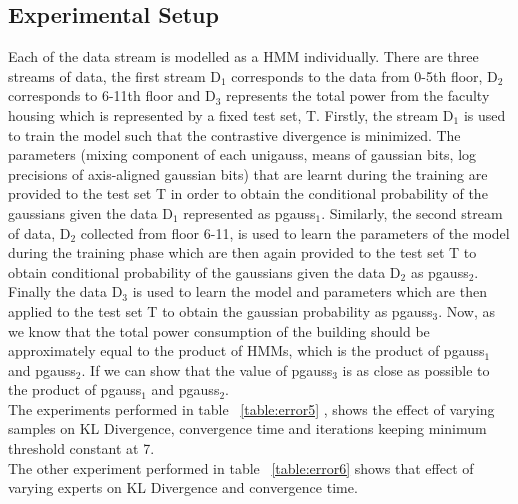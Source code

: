 \documentclass{sig-alternate}
\begin{document}
\subsection{ Experimental Setup } 
Each of the data stream is modelled as a HMM individually. There are three streams of data, the first stream D$_{1}$ corresponds to the data from 0-5th floor, D$_{2}$ corresponds to 6-11th floor and D$_{3}$ represents the total power from the faculty housing which is represented by a fixed test set, T. Firstly, the stream D$_{1}$ is used to train the model such that the contrastive divergence is minimized. The parameters (mixing component of each unigauss, means of gaussian bits, log precisions of axis-aligned gaussian bits) that are learnt during the training are provided to the test set T in order to obtain the conditional probability of the gaussians given the data D$_{1}$ represented as pgauss$_{1}$. Similarly, the second stream of data, D$_{2}$ collected from floor 6-11, is used to learn the parameters of the model during the training phase which are then again provided to the test set T to obtain conditional probability of the gaussians given the data D$_{2}$ as pgauss$_{2}$. Finally the data D$_{3}$ is used to learn the model and parameters which are then applied to the test set T to obtain the gaussian probability as pgauss$_{3}$. Now, as we know that the total power consumption of the building should be approximately equal to the product of HMMs, which is the product of pgauss$_{1}$ and pgauss$_{2}$. If we can show that the value of pgauss$_{3}$ is as close as possible to the product of pgauss$_{1}$ and pgauss$_{2}$.\\
The experiments performed in table ~\ref{table:error5} , shows the effect of varying samples on KL Divergence, convergence time and iterations keeping minimum threshold constant at 7.\\
The other experiment performed in table ~\ref{table:error6} shows that effect of varying experts on KL Divergence and convergence time.
\end{document}
